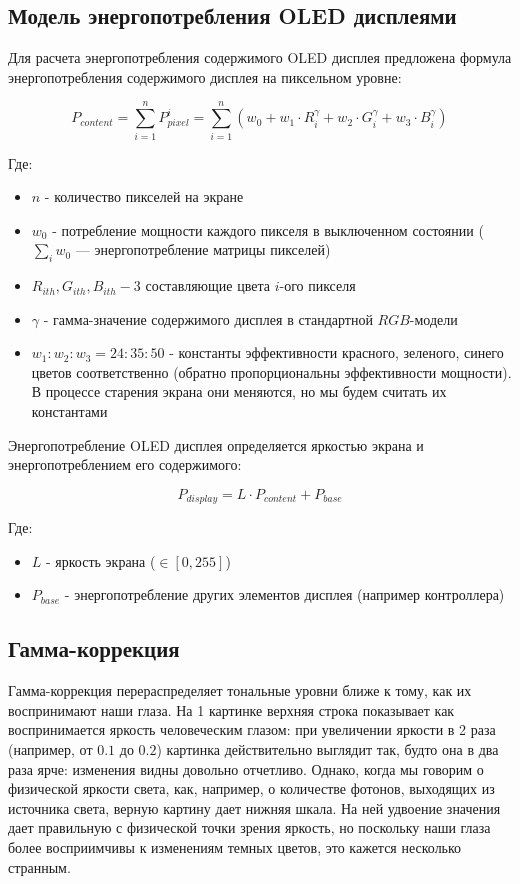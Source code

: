 \documentclass[a4paper, 12pt]{article}
\begin{document}
\subsection*{Модель энергопотребления 
    OLED дисплеями}

	Для расчета энергопотребления содержимого OLED дисплея предложена формула энергопотребления содержимого дисплея на пиксельном уровне:
	
	\[P_{content}=\sum_{i=1}^n P_{pixel}^i= \sum_{i=1}^n (w_0+w_1\cdot R_i^{\gamma} + w_2\cdot G_i^{\gamma}+w_3\cdot B_i^{\gamma})\]
    
    Где:
    \begin{itemize}
    	\item $n$ - количество пикселей на экране
    	\item $w_0$ - потребление мощности каждого пикселя в выключенном состоянии ($\sum_i w_0$ — энергопотребление матрицы пикселей)
    	\item $R_{ith},G_{ith}, B_{ith} - 3$ составляющие цвета $i$-ого пикселя
    	\item $\gamma$ - гамма-значение содержимого дисплея в стандартной $RGB$-модели
    	\item $w_1:w_2:w_3 = 24:35:50$ - константы эффективности красного, зеленого, синего цветов соответственно (обратно пропорциональны эффективности мощности). В процессе старения экрана они меняются, но мы будем считать их константами 
    \end{itemize}
    
    Энергопотребление OLED дисплея определяется яркостью экрана и энергопотреблением его содержимого:
    
    \[P_{display}=L\cdot P_{content}+P_{base}\]
    
    Где:
    \begin{itemize}
    	\item $L$ - яркость экрана ($\in [0, 255]$)
    	\item $P_{base}$ - энергопотребление других элементов дисплея (например контроллера)
    \end{itemize}
    
\subsection*{Гамма-коррекция}

	Гамма-коррекция перераспределяет тональные уровни ближе к тому, как их воспринимают наши глаза. На 1 картинке верхняя строка показывает как воспринимается яркость человеческим глазом: при увеличении яркости в 2 раза (например, от $0.1$ до $0.2$) картинка действительно выглядит так, будто она в два раза ярче: изменения видны довольно отчетливо. Однако, когда мы говорим о физической яркости света, как, например, о количестве фотонов, выходящих из источника света, верную картину дает нижняя шкала. На ней удвоение значения дает правильную с физической точки зрения яркость, но поскольку наши глаза более восприимчивы к изменениям темных цветов, это кажется несколько странным.
	
\end{document}
